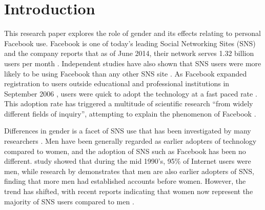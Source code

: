 \section{Introduction}



This research paper explores the role of gender and its effects relating to personal Facebook use. Facebook is one of today's leading Social Networking Sites (SNS) and the company reports that as of June 2014, their network serves 1.32 billion users per month \citep{Facebook2014}. Independent studies have also shown that SNS users were more likely to be using Facebook than any other SNS site \citep{Hampton2011, Raacke2008, Hargittai2007}. As Facebook expanded registration to users outside educational and professional institutions in September 2006 \citep{Facebook2014}, users were quick to adopt the technology at a fast paced rate \citep{Mazman2011}. This adoption rate has triggered a multitude of scientific research ``from widely different fields of inquiry'', attempting to explain the phenomenon of Facebook \citep[p. 983]{Caers2013}. 

Differences in gender is a facet of SNS use that has been investigated by many researchers \citep{Fallows2005, Haferkamp2012, Hargittai2007, Joiner2014, Kimbrough2013, Mathiyalakan2014, Mazman2011}. Men have been generally regarded as earlier adopters of technology compared to women, and the adoption of SNS such as Facebook has been no different.  study showed that during the mid 1990's, 95\% of Internet users were men, while research by \citet{Fogel2009} demonstrates that men are also earlier adopters of SNS, finding that more men had established accounts before women. However, the trend has shifted, with recent reports indicating that women now represent the majority of SNS users compared to men \citep{Duggan2013, Hampton2011}.

